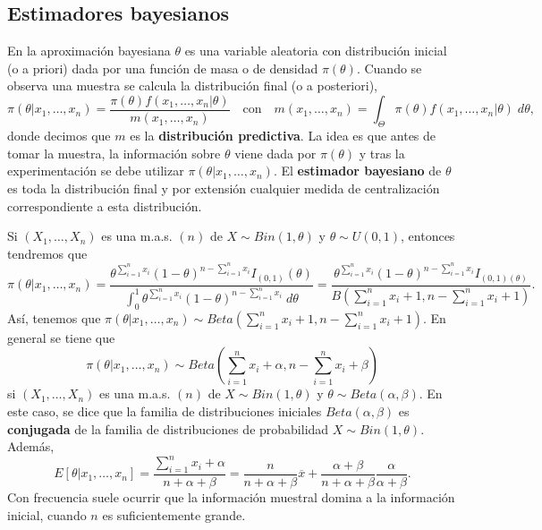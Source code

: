 \subsection{Estimadores bayesianos}
En la aproximación bayesiana $\displaystyle \theta  $ es una variable aleatoria con distribución inicial (o a priori) dada por una función de masa o de densidad $\displaystyle \pi\left(\theta\right) $. Cuando se observa una muestra se calcula la distribución final (o a posteriori),
\[\pi\left(\theta|x_{1}, \ldots, x_{n}\right)=\frac{\pi\left(\theta\right)f\left(x_{1}, \ldots, x_{n}|\theta \right)}{m\left(x_{1}, \ldots, x_{n}\right)}\quad \text{con}\quad m\left(x_{1}, \ldots, x_{n}\right)=\int _{\Theta }\pi\left(\theta\right)f\left(x_{1}, \ldots, x_{n}|\theta \right) \; d\theta ,\]
donde decimos que $\displaystyle m $ es la \textbf{distribución predictiva}. La idea es que antes de tomar la muestra, la información sobre $\displaystyle \theta $ viene dada por $\displaystyle \pi\left(\theta\right) $ y tras la experimentación se debe utilizar $\displaystyle \pi\left(\theta|x_{1}, \ldots, x_{n}\right) $. El \textbf{estimador bayesiano} de $\displaystyle \theta $ es toda la distribución final y por extensión cualquier medida de centralización correspondiente a esta distribución. 
\begin{eg}
Si $\displaystyle \left(X_{1}, \ldots, X_{n}\right) $ es una m.a.s. $\displaystyle \left(n\right) $ de $\displaystyle X\sim Bin\left(1, \theta\right) $ y $\displaystyle \theta\sim U\left(0,1\right) $, entonces tendremos que 
\[\pi\left(\theta|x_{1}, \ldots, x_{n}\right)=\frac{\theta^{\sum^{n}_{i = 1}x_{i}}\left(1-\theta\right)^{n-\sum^{n}_{i = 1}x_{i}}I_{\left(0,1\right)}\left(\theta\right) }{\int^{1}_{0} \theta^{\sum^{n}_{i = 1}x_{i}}\left(1-\theta\right)^{n-\sum^{n}_{i = 1}x_{i}} \; d\theta} = \frac{\theta^{\sum^{n}_{i = 1}x_{i}}\left(1-\theta\right)^{n-\sum^{n}_{i = 1}x_{i}}I_{\left(0,1\right)\left(\theta\right)}}{B\left(\sum^{n}_{i = 1}x_{i}+1, n-\sum^{n}_{i = 1}x_{i}+1\right)} .\]
Así, tenemos que $\displaystyle \pi\left(\theta|x_{1}, \ldots, x_{n}\right)\sim Beta\left(\sum^{n}_{i = 1}x_{i}+1, n -\sum^{n}_{i = 1}x_{i}+1\right) $. En general se tiene que 
\[\pi\left(\theta|x_{1}, \ldots, x_{n}\right)\sim Beta\left(\sum^{n}_{i = 1}x_{i}+\alpha, n - \sum^{n}_{i = 1}x_{i}+\beta \right) \]
si $\displaystyle \left(X_{1}, \ldots, X_{n}\right) $ es una m.a.s. $\displaystyle \left(n\right) $ de $\displaystyle X \sim Bin\left(1, \theta \right) $ y $\displaystyle \theta\sim Beta\left(\alpha, \beta \right) $. En este caso, se dice que la familia de distribuciones iniciales $\displaystyle Beta\left(\alpha, \beta \right) $ es \textbf{conjugada} de la familia de distribuciones de probabilidad $\displaystyle X\sim Bin\left(1,\theta \right) $. Además, 
\[E\left[\theta|x_{1}, \ldots, x_{n}\right] =\frac{\sum^{n}_{i=1}x_{i}+\alpha }{n + \alpha + \beta }=\frac{n}{n + \alpha + \beta }\overline{x} + \frac{\alpha + \beta }{n + \alpha + \beta }\frac{\alpha }{\alpha + \beta } .\]
Con frecuencia suele ocurrir que la información muestral domina a la información inicial, cuando $\displaystyle n $ es suficientemente grande. 
\end{eg}
